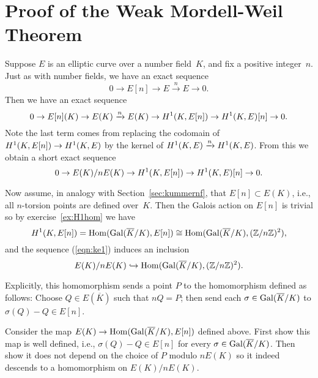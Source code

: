 
\section{Proof of the Weak Mordell-Weil Theorem}
Suppose $E$ is an elliptic curve over a number field~$K$, and
fix a positive integer~$n$.
Just as with number fields, we have an exact sequence
\[
  0 \to E[n] \to E \xrightarrow{n} E \to 0.
\]
Then we have an exact sequence
\[
  0 \to E[n](K) \to E(K) \xrightarrow{n} E(K) \to H^1(K,E[n]) \to H^1(K,E)[n] \to 0.
\]
Note the last term comes from replacing the codomain of
$H^1(K,E[n]) \to H^1(K,E)$ by the kernel of $H^1(K,E) \xrightarrow{n} H^1(K,E)$.
From this we obtain a short exact sequence
\begin{equation}\label{eqn:ke1}
  0 \to E(K)/n E(K) \to H^1(K,E[n]) \to H^1(K,E)[n] \to 0.
\end{equation}

Now assume, in analogy with Section~\ref{sec:kummernf}, that
$E[n]\subset E(K)$, i.e., all $n$-torsion points are defined over~$K$.
Then the Galois action on $E[n]$ is trivial so by
exercise~\ref{ex:H1hom} we have
\[
  H^1(K,E[n]) = \operatorname{Hom}(\operatorname{Gal}(\overline{K}/K),E[n]) \cong
  \operatorname{Hom}(\operatorname{Gal}(\overline{K}/K),(\mathbb{Z}/n\mathbb{Z})^2),
\]
and the sequence (\ref{eqn:ke1}) induces an inclusion
\begin{equation}\label{eqn:injmw}
  E(K)/n E(K) \hookrightarrow \operatorname{Hom}(\operatorname{Gal}(\overline{K}/K),(\mathbb{Z}/n\mathbb{Z})^2).
\end{equation}

Explicitly, this homomorphism sends a point $P$ to the homomorphism
defined as follows: Choose $Q \in E(\overline{K})$ such that $nQ = P$; then
send each $\sigma \in \operatorname{Gal}(\overline{K}/K)$ to $\sigma(Q)-Q\in E[n]$.

\begin{exercise}\label{ex:sigmaQ-QinEn}
  Consider the map $E(K) \to \operatorname{Hom}(\operatorname{Gal}(\overline{K}/K),E[n])$ defined above.
  First show this map is well defined, i.e., $\sigma(Q) - Q \in E[n]$
  for every $\sigma\in \operatorname{Gal}(\overline{K}/K)$.
  Then show it does not depend on the choice of $P$ modulo $nE(K)$
  so it indeed descends to a homomorphism on $E(K)/nE(K)$.
\end{exercise}

